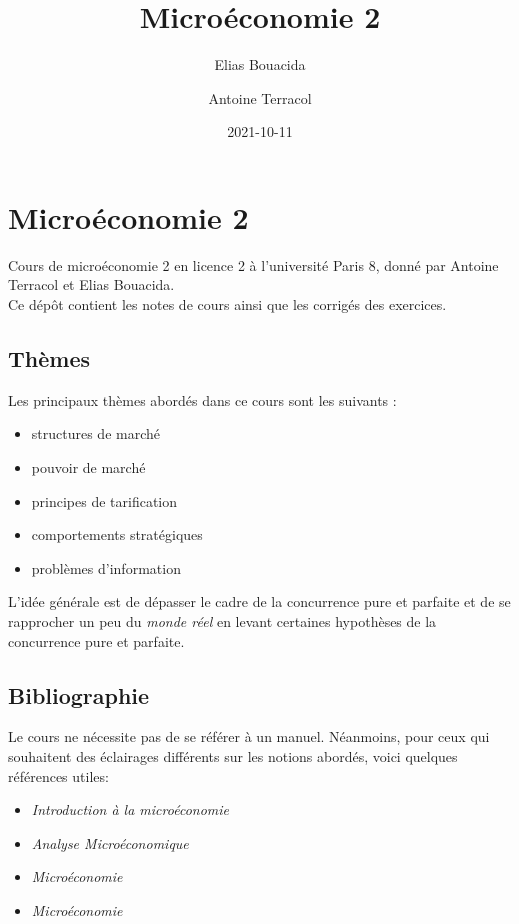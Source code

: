 \documentclass[
]{book}
\title{Microéconomie 2}
\author{Elias Bouacida \and Antoine Terracol}
\date{2021-10-11}
\providecommand{\tightlist}{%
  \setlength{\itemsep}{0pt}\setlength{\parskip}{0pt}}
\theoremstyle{definition}
\theoremstyle{definition}
\theoremstyle{definition}
\theoremstyle{definition}
\theoremstyle{remark}
\begin{document}
\maketitle

{
\setcounter{tocdepth}{1}
\tableofcontents
}
\hypertarget{microuxe9conomie-2}{%
\chapter{Microéconomie 2}\label{microuxe9conomie-2}}

Cours de microéconomie 2 en licence 2 à l'université Paris 8, donné par Antoine Terracol et Elias Bouacida.\\
Ce dépôt contient les notes de cours ainsi que les corrigés des exercices.

\hypertarget{thuxe8mes}{%
\section{Thèmes}\label{thuxe8mes}}

Les principaux thèmes abordés dans ce cours sont les suivants :

\begin{itemize}
\tightlist
\item
  structures de marché
\item
  pouvoir de marché
\item
  principes de tarification
\item
  comportements stratégiques
\item
  problèmes d'information
\end{itemize}

L'idée générale est de dépasser le cadre de la concurrence pure et parfaite et de se rapprocher un peu du \emph{monde réel} en levant certaines hypothèses de la concurrence pure et parfaite.

\hypertarget{bibliographie}{%
\section{Bibliographie}\label{bibliographie}}

Le cours ne nécessite pas de se référer à un manuel.
Néanmoins, pour ceux qui souhaitent des éclairages différents sur les notions abordés, voici quelques références utiles:

\begin{itemize}
\tightlist
\item
  \citet{varian2015} \emph{Introduction à la microéconomie}
\item
  \citet{varian2008} \emph{Analyse Microéconomique}
\item
  \citet{pindyck2012} \emph{Microéconomie}
\item
  \citet{jeleva2014} \emph{Microéconomie}
\end{itemize}
\end{document}
